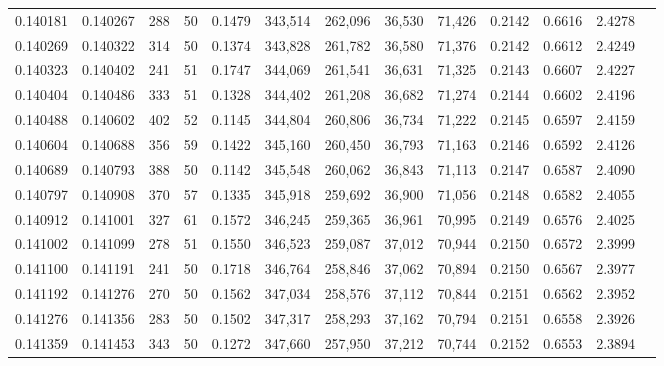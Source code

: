 \begin{tabular}{rrrrrrrrrrrrr}
0.140181 & 0.140267 &   288 &  50 &                                     0.1479 & 343,514 & 262,096 &  36,530 &  71,426 & 0.2142 & 0.6616 & 2.4278 \\
0.140269 & 0.140322 &   314 &  50 &                                     0.1374 & 343,828 & 261,782 &  36,580 &  71,376 & 0.2142 & 0.6612 & 2.4249 \\
0.140323 & 0.140402 &   241 &  51 &                                     0.1747 & 344,069 & 261,541 &  36,631 &  71,325 & 0.2143 & 0.6607 & 2.4227 \\
0.140404 & 0.140486 &   333 &  51 &                                     0.1328 & 344,402 & 261,208 &  36,682 &  71,274 & 0.2144 & 0.6602 & 2.4196 \\
0.140488 & 0.140602 &   402 &  52 &                                     0.1145 & 344,804 & 260,806 &  36,734 &  71,222 & 0.2145 & 0.6597 & 2.4159 \\
0.140604 & 0.140688 &   356 &  59 &                                     0.1422 & 345,160 & 260,450 &  36,793 &  71,163 & 0.2146 & 0.6592 & 2.4126 \\
0.140689 & 0.140793 &   388 &  50 &                                     0.1142 & 345,548 & 260,062 &  36,843 &  71,113 & 0.2147 & 0.6587 & 2.4090 \\
0.140797 & 0.140908 &   370 &  57 &                                     0.1335 & 345,918 & 259,692 &  36,900 &  71,056 & 0.2148 & 0.6582 & 2.4055 \\
0.140912 & 0.141001 &   327 &  61 &                                     0.1572 & 346,245 & 259,365 &  36,961 &  70,995 & 0.2149 & 0.6576 & 2.4025 \\
0.141002 & 0.141099 &   278 &  51 &                                     0.1550 & 346,523 & 259,087 &  37,012 &  70,944 & 0.2150 & 0.6572 & 2.3999 \\
0.141100 & 0.141191 &   241 &  50 &                                     0.1718 & 346,764 & 258,846 &  37,062 &  70,894 & 0.2150 & 0.6567 & 2.3977 \\
0.141192 & 0.141276 &   270 &  50 &                                     0.1562 & 347,034 & 258,576 &  37,112 &  70,844 & 0.2151 & 0.6562 & 2.3952 \\
0.141276 & 0.141356 &   283 &  50 &                                     0.1502 & 347,317 & 258,293 &  37,162 &  70,794 & 0.2151 & 0.6558 & 2.3926 \\
0.141359 & 0.141453 &   343 &  50 &                                     0.1272 & 347,660 & 257,950 &  37,212 &  70,744 & 0.2152 & 0.6553 & 2.3894 \\

\end{tabular}
